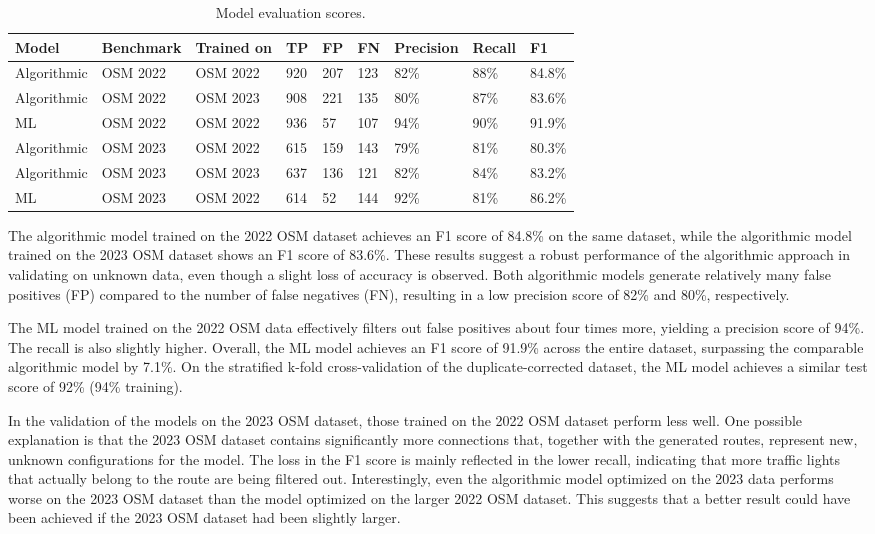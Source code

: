 \begin{table}[h]
\caption{Model evaluation scores.}
\begin{tabular}{@{}lllllllll@{}}
\toprule
  \textbf{Model} & \textbf{Benchmark} & \textbf{Trained on} & \textbf{TP} & \textbf{FP} & \textbf{FN} & \textbf{Precision} & \textbf{Recall} & \textbf{F1} \\
  \midrule
  Algorithmic & OSM 2022 & OSM 2022 & 920 & 207 & 123 & 82\% & 88\% & 84.8\% \\
  Algorithmic & OSM 2022 & OSM 2023 & 908 & 221 & 135 & 80\% & 87\% & 83.6\% \\
  ML          & OSM 2022 & OSM 2022 & 936 & 57 & 107 & 94\% & 90\% & 91.9\% \\
  \midrule
  Algorithmic & OSM 2023 & OSM 2022 & 615 & 159 & 143 & 79\% & 81\% & 80.3\% \\
  Algorithmic & OSM 2023 & OSM 2023 & 637 & 136 & 121 & 82\% & 84\% & 83.2\% \\
  ML          & OSM 2023 & OSM 2022 & 614 & 52 & 144 & 92\% & 81\% & 86.2\% \\
\bottomrule
\end{tabular}
\label{tab:model-scores}
\end{table}

The algorithmic model trained on the 2022 OSM dataset achieves an F1 score of 84.8\% on the same dataset, while the algorithmic model trained on the 2023 OSM dataset shows an F1 score of 83.6\%. These results suggest a robust performance of the algorithmic approach in validating on unknown data, even though a slight loss of accuracy is observed. Both algorithmic models generate relatively many false positives (FP) compared to the number of false negatives (FN), resulting in a low precision score of 82\% and 80\%, respectively.

The ML model trained on the 2022 OSM data effectively filters out false positives about four times more, yielding a precision score of 94\%. The recall is also slightly higher. Overall, the ML model achieves an F1 score of 91.9\% across the entire dataset, surpassing the comparable algorithmic model by 7.1\%. On the stratified k-fold cross-validation of the duplicate-corrected dataset, the ML model achieves a similar test score of 92\% (94\% training).

In the validation of the models on the 2023 OSM dataset, those trained on the 2022 OSM dataset perform less well. One possible explanation is that the 2023 OSM dataset contains significantly more connections that, together with the generated routes, represent new, unknown configurations for the model. The loss in the F1 score is mainly reflected in the lower recall, indicating that more traffic lights that actually belong to the route are being filtered out. Interestingly, even the algorithmic model optimized on the 2023 data performs worse on the 2023 OSM dataset than the model optimized on the larger 2022 OSM dataset. This suggests that a better result could have been achieved if the 2023 OSM dataset had been slightly larger.

